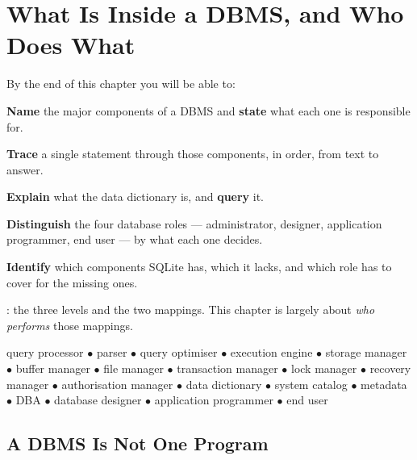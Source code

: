 \chapter{What Is Inside a DBMS, and Who Does What}\label{ch:whodoeswhat}

\begin{outcomes}
By the end of this chapter you will be able to:
\begin{tight}
  \item \textbf{Name} the major components of a DBMS and \textbf{state} what
        each one is responsible for.
  \item \textbf{Trace} a single  statement through those
        components, in order, from text to answer.
  \item \textbf{Explain} what the data dictionary is, and \textbf{query} it.
  \item \textbf{Distinguish} the four database roles --- administrator,
        designer, application programmer, end user --- by what each one
        decides.
  \item \textbf{Identify} which components SQLite has, which it lacks, and
        which role has to cover for the missing ones.
\end{tight}
\end{outcomes}

\begin{prereq}
: the three levels and the two mappings. This chapter is
largely about \emph{who performs} those mappings.
\end{prereq}

\begin{keyterms}
query processor $\bullet$ parser $\bullet$ query optimiser $\bullet$ execution
engine $\bullet$ storage manager $\bullet$ buffer manager $\bullet$ file
manager $\bullet$ transaction manager $\bullet$ lock manager $\bullet$ recovery
manager $\bullet$ authorisation manager $\bullet$ data dictionary $\bullet$
system catalog $\bullet$ metadata $\bullet$ DBA $\bullet$ database designer
$\bullet$ application programmer $\bullet$ end user
\end{keyterms}

\section{A DBMS Is Not One Program}

